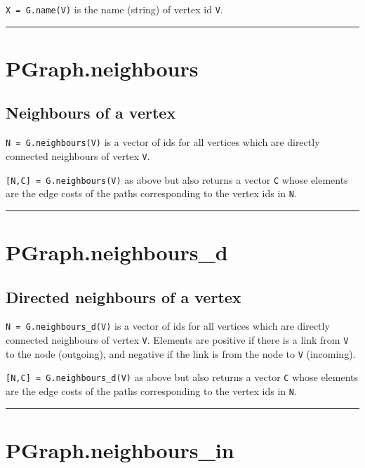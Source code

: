 \texttt{X = G.name(V)} is the name (string) of vertex id \texttt{V}.

\vspace{1.5ex}\hrule

\hypertarget{PGraph.neighbours}{\section*{PGraph.neighbours}}
\subsection*{Neighbours of a vertex}


\texttt{N = G.neighbours(V)} is a vector of ids for all vertices which are
directly connected neighbours of vertex \texttt{V}.



\texttt{[N,C] = G.neighbours(V)} as above but also returns a vector \texttt{C} whose elements
are the edge costs of the paths corresponding to the vertex ids in \texttt{N}.

\vspace{1.5ex}\hrule

\hypertarget{PGraph.neighbours\_d}{\section*{PGraph.neighbours\_d}}
\subsection*{Directed neighbours of a vertex}


\texttt{N = G.neighbours\_d(V)} is a vector of ids for all vertices which are
directly connected neighbours of vertex \texttt{V}.  Elements are positive
if there is a link from \texttt{V} to the node (outgoing), and negative if the link
is from the node to \texttt{V} (incoming).



\texttt{[N,C] = G.neighbours\_d(V)} as above but also returns a vector \texttt{C} whose elements
are the edge costs of the paths corresponding to the vertex ids in \texttt{N}.

\vspace{1.5ex}\hrule

\hypertarget{PGraph.neighbours\_in}{\section*{PGraph.neighbours\_in}}
